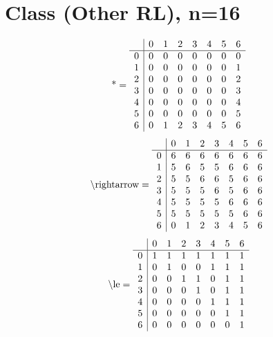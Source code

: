 \documentclass[11pt]{article}
\begin{document}
\section{Class (Other RL), n=16}
\[\text{*} = 
\begin{array}{r | r r r r r r r}
 & 0 & 1 & 2 & 3 & 4 & 5 & 6 \\ \hline
0 & 0 & 0 & 0 & 0 & 0 & 0 & 0 \\
1 & 0 & 0 & 0 & 0 & 0 & 0 & 1 \\
2 & 0 & 0 & 0 & 0 & 0 & 0 & 2 \\
3 & 0 & 0 & 0 & 0 & 0 & 0 & 3 \\
4 & 0 & 0 & 0 & 0 & 0 & 0 & 4 \\
5 & 0 & 0 & 0 & 0 & 0 & 0 & 5 \\
6 & 0 & 1 & 2 & 3 & 4 & 5 & 6 \\
\end{array}
\]
\[\text{\textbackslash rightarrow} = 
\begin{array}{r | r r r r r r r}
 & 0 & 1 & 2 & 3 & 4 & 5 & 6 \\ \hline
0 & 6 & 6 & 6 & 6 & 6 & 6 & 6 \\
1 & 5 & 6 & 5 & 5 & 6 & 6 & 6 \\
2 & 5 & 5 & 6 & 6 & 5 & 6 & 6 \\
3 & 5 & 5 & 5 & 6 & 5 & 6 & 6 \\
4 & 5 & 5 & 5 & 5 & 6 & 6 & 6 \\
5 & 5 & 5 & 5 & 5 & 5 & 6 & 6 \\
6 & 0 & 1 & 2 & 3 & 4 & 5 & 6 \\
\end{array}
\]
\[\text{\textbackslash le} = 
\begin{array}{r | r r r r r r r}
 & 0 & 1 & 2 & 3 & 4 & 5 & 6 \\ \hline
0 & 1 & 1 & 1 & 1 & 1 & 1 & 1 \\
1 & 0 & 1 & 0 & 0 & 1 & 1 & 1 \\
2 & 0 & 0 & 1 & 1 & 0 & 1 & 1 \\
3 & 0 & 0 & 0 & 1 & 0 & 1 & 1 \\
4 & 0 & 0 & 0 & 0 & 1 & 1 & 1 \\
5 & 0 & 0 & 0 & 0 & 0 & 1 & 1 \\
6 & 0 & 0 & 0 & 0 & 0 & 0 & 1 \\
\end{array}
\]
\end{document}

